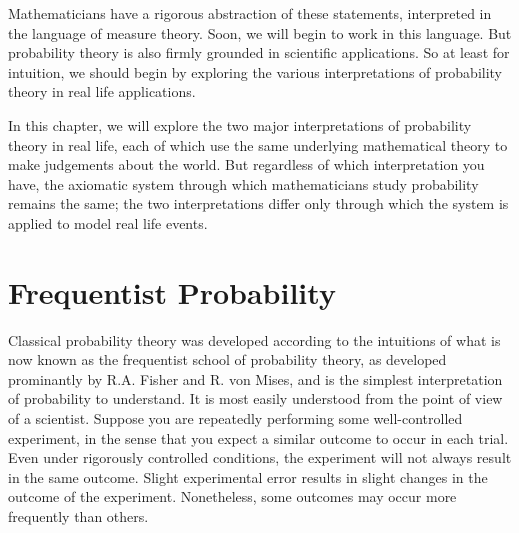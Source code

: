 Mathematicians have a rigorous abstraction of these statements, interpreted in the language of measure theory. Soon, we will begin to work in this language. But probability theory is also firmly grounded in scientific applications. So at least for intuition, we should begin by exploring the various interpretations of probability theory in real life applications.

In this chapter, we will explore the two major interpretations of probability theory in real life, each of which use the same underlying mathematical theory to make judgements about the world. But regardless of which interpretation you have, the axiomatic system through which mathematicians study probability remains the same; the two interpretations differ only through which the system is applied to model real life events.

\section{Frequentist Probability}

Classical probability theory was developed according to the intuitions of what is now known as the frequentist school of probability theory, as developed prominantly by R.A. Fisher and R. von Mises, and is the simplest interpretation of probability to understand. It is most easily understood from the point of view of a scientist. Suppose you are repeatedly performing some well-controlled experiment, in the sense that you expect a similar outcome to occur in each trial. Even under rigorously controlled conditions, the experiment will not always result in the same outcome. Slight experimental error results in slight changes in the outcome of the experiment. Nonetheless, some outcomes may occur more frequently than others.

